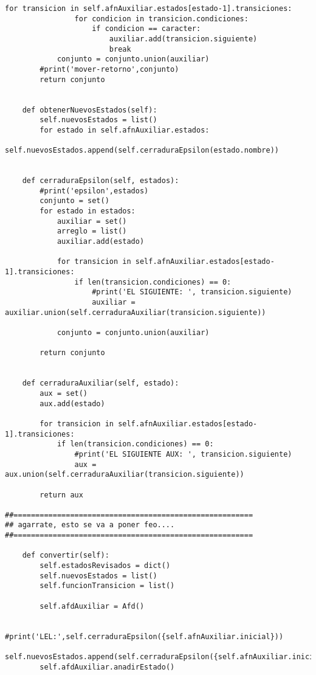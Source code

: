 \begin{lstlisting}[frame=single]
            for transicion in self.afnAuxiliar.estados[estado-1].transiciones:
                for condicion in transicion.condiciones:
                    if condicion == caracter:
                        auxiliar.add(transicion.siguiente)
                        break
            conjunto = conjunto.union(auxiliar)
        #print('mover-retorno',conjunto)
        return conjunto


    def obtenerNuevosEstados(self):
        self.nuevosEstados = list()
        for estado in self.afnAuxiliar.estados:
            self.nuevosEstados.append(self.cerraduraEpsilon(estado.nombre))


    def cerraduraEpsilon(self, estados):
        #print('epsilon',estados)
        conjunto = set()
        for estado in estados:
            auxiliar = set()
            arreglo = list()
            auxiliar.add(estado)

            for transicion in self.afnAuxiliar.estados[estado-1].transiciones:
                if len(transicion.condiciones) == 0:
                    #print('EL SIGUIENTE: ', transicion.siguiente)
                    auxiliar = auxiliar.union(self.cerraduraAuxiliar(transicion.siguiente))

            conjunto = conjunto.union(auxiliar)

        return conjunto


    def cerraduraAuxiliar(self, estado):
        aux = set()
        aux.add(estado)

        for transicion in self.afnAuxiliar.estados[estado-1].transiciones:
            if len(transicion.condiciones) == 0:
                #print('EL SIGUIENTE AUX: ', transicion.siguiente)
                aux = aux.union(self.cerraduraAuxiliar(transicion.siguiente))

        return aux

##=======================================================
## agarrate, esto se va a poner feo....
##=======================================================

    def convertir(self):
        self.estadosRevisados = dict()
        self.nuevosEstados = list()
        self.funcionTransicion = list()

        self.afdAuxiliar = Afd()

        #print('LEL:',self.cerraduraEpsilon({self.afnAuxiliar.inicial}))
        self.nuevosEstados.append(self.cerraduraEpsilon({self.afnAuxiliar.inicial}))
        self.afdAuxiliar.anadirEstado()


\end{lstlisting}
